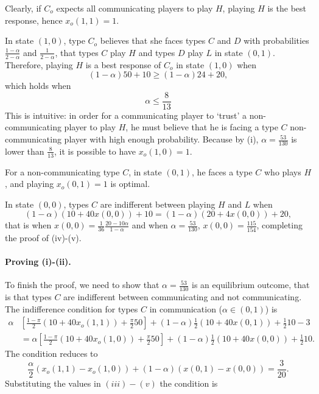 \documentclass[12pt]{article}
\theoremstyle{break}
\begin{document}
Clearly, if $C_o$ expects all communicating players to play $H$, playing $H$ is the best response, hence $x_o(1,1)=1$. 

In state $(1,0)$, type $C_o$ believes that she faces types $C$ and $D$ with probabilities $\frac{1-\alpha}{2-\alpha}$ and $\frac{1}{2-\alpha}$, that types $C$ play $H$ and types $D$ play $L$ in state $(0,1)$. Therefore, playing $H$ is a best response of $C_o$ in state $(1,0)$ when
%
\[
(1-\alpha)50+10\geq (1-\alpha)24+20,
\]
%
which holds when 
%
\begin{equation}\label{cond-FC-H-10}
	\alpha\leq \frac{8}{13}
\end{equation}
%
This is intuitive: in order for a communicating player to `trust' a non-communicating player to play $H$, he must believe that he is facing a type $C$ non-communicating player with high enough probability. Because by (i), $\alpha=\frac{53}{130}$ is lower than $\frac{8}{13}$, it is possible to have $x_o(1,0)=1$. 

For a non-communicating type $C$, in state $(0,1)$, he faces a type $C$ who plays $H$, and playing $x_o(0,1)=1$ is optimal. 

In state $(0,0)$, types $C$ are indifferent between playing $H$ and $L$ when 
%
\[
(1-\alpha)(10+40 x(0,0))+10=(1-\alpha)(20+4x(0,0))+20,
\]
%
that is when $x(0,0)=\frac{1}{36}\frac{20-10\alpha}{1-\alpha}$ and when $\alpha=\frac{53}{130}$, $x(0,0)=\frac{115}{154}$, completing the proof of (iv)-(v). 





\paragraph{Proving (i)-(ii).} To finish the proof, we need to show that $\alpha=\frac{53}{130}$ is an equilibrium outcome, that is that types $C$ are indifferent between communicating and not communicating. The indifference condition for types $C$ in communication ($\alpha\in(0,1)$) is
\begin{align*}
	\alpha&\left[\frac{1-\pi}{2}(10+40 x_o(1,1))+\frac{\pi}{2}50\right]+(1-\alpha)\frac{1}{2}(10+40x(0,1))+\frac{1}{2}10-3\\
		&=\alpha\left[\frac{1-\pi}{2}(10+40 x_o(1,0))+\frac{\pi}{2}50\right]+(1-\alpha)\frac{1}{2}(10+40x(0,0))+\frac{1}{2}10.
\end{align*}
The condition reduces to 
\begin{equation}\label{IC-comm}
	\frac{\alpha}{2} (x_o(1,1)-x_o(1,0))+(1-\alpha) (x(0,1)-x(0,0))=\frac{3}{20}.	
\end{equation}
%
Substituting the values in $(iii)-(v)$ the condition is 
\end{document}
